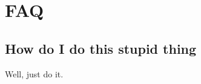 \chapter{FAQ}
\label{section:faq}

\section{How do I do this stupid thing}
\label{section:faq_stupid_thing}

Well, just do it.